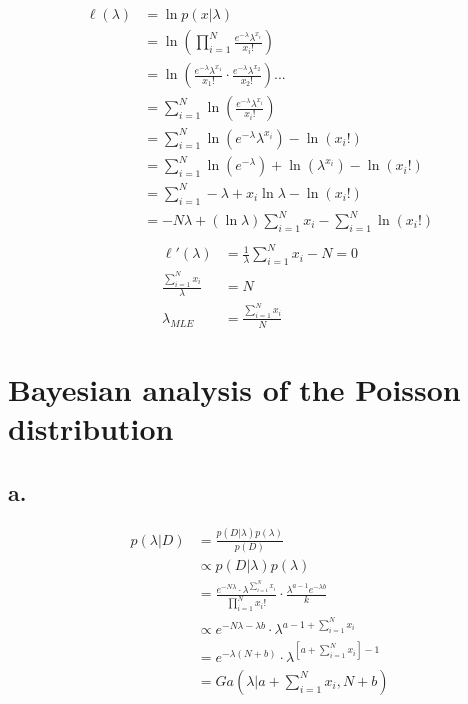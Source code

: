 \documentclass{article}
\begin{document}
\begin{align*}
  \ell(\lambda) &= \ln p(x|\lambda) \\
                &= \ln \left( \prod_{i=1}^N \frac{e^{-\lambda}\lambda^{x_i}}{x_i!}
                  \right) \\
                &= \ln \left( \frac{e^{-\lambda}\lambda^{x_1}}{x_1!} \cdot
                  \frac{e^{-\lambda}\lambda^{x_2}}{x_2!} \right) ... \\
                &= \sum_{i=1}^N \ln \left(
                  \frac{e^{-\lambda}\lambda^{x_i}}{x_i!} \right) \\
                &= \sum_{i=1}^N \ln (e^{-\lambda} \lambda^{x_i}) - \ln(x_i!) \\
                &= \sum_{i=1}^N \ln (e^{-\lambda}) + \ln (\lambda^{x_i}) - \ln
                  (x_i!) \\
                &= \sum_{i=1}^N -\lambda + x_i \ln \lambda - \ln
                  \left( x_i! \right) \\
                &= -N\lambda + \left( \ln \lambda \right) \sum_{i=1}^N {x_i} -
                  \sum_{i=1}^N \ln \left( x_i! \right) \\
\end{align*}
\begin{align*}
  \ell'(\lambda) &= \frac{1}{\lambda} \sum_{i=1}^N {x_i} - N = 0 \\
  \frac{\sum_{i=1}^N {x_i}}{\lambda} &= N \\
  \lambda_{MLE} &= \frac{\sum_{i=1}^N x_i}{N}
\end{align*}

\section{Bayesian analysis of the Poisson distribution}
\subsection{a.}

\begin{align*}
  p(\lambda|D) &= \frac{p(D|\lambda)p(\lambda)}{p(D)} \\
               &\propto p(D|\lambda)p(\lambda) \\
               &= \frac{e^{-N\lambda} \cdot \lambda^{\sum_{i=1}^N
                 x_i}}{\prod_{i=1}^N x_i!} \cdot \frac{\lambda^{a-1}
                 e^{-\lambda b}}{k} \\
               &\propto e^{-N\lambda - \lambda b} \cdot
                 \lambda^{a - 1 + \sum_{i=1}^N x_i} \\
               &= e^{-\lambda (N + b)} \cdot \lambda^{ \left[ a +
                 \sum_{i=1}^N x_i \right] - 1} \\
               &= Ga(\lambda | a + \sum_{i=1}^N x_i, N + b)
\end{align*}
\end{document}
